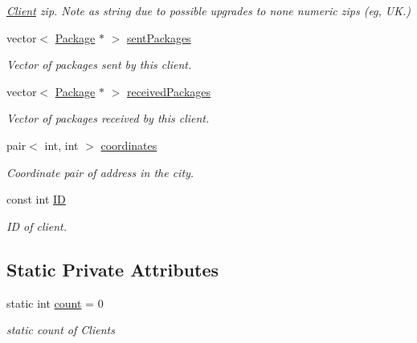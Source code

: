 \begin{DoxyCompactItemize}
\begin{DoxyCompactList}\small\item\em \hyperlink{classClient}{Client} zip. Note as string due to possible upgrades to none numeric zips (eg, UK.) \end{DoxyCompactList}\item 
vector$<$ \hyperlink{classPackage}{Package} $\ast$ $>$ \hyperlink{classClient_a2b2adb035b1729e5914a2ff85e672c88}{sent\+Packages}\hypertarget{classClient_a2b2adb035b1729e5914a2ff85e672c88}{}\label{classClient_a2b2adb035b1729e5914a2ff85e672c88}

\begin{DoxyCompactList}\small\item\em Vector of packages sent by this client. \end{DoxyCompactList}\item 
vector$<$ \hyperlink{classPackage}{Package} $\ast$ $>$ \hyperlink{classClient_ae0b61b806652c0dd46a5ef3e0308fb51}{received\+Packages}\hypertarget{classClient_ae0b61b806652c0dd46a5ef3e0308fb51}{}\label{classClient_ae0b61b806652c0dd46a5ef3e0308fb51}

\begin{DoxyCompactList}\small\item\em Vector of packages received by this client. \end{DoxyCompactList}\item 
pair$<$ int, int $>$ \hyperlink{classClient_a521946a39509ca76f9ef7bea68e47153}{coordinates}\hypertarget{classClient_a521946a39509ca76f9ef7bea68e47153}{}\label{classClient_a521946a39509ca76f9ef7bea68e47153}

\begin{DoxyCompactList}\small\item\em Coordinate pair of address in the city. \end{DoxyCompactList}\item 
const int \hyperlink{classClient_a08c0686b646ab315da55e7f910af7a28}{ID}\hypertarget{classClient_a08c0686b646ab315da55e7f910af7a28}{}\label{classClient_a08c0686b646ab315da55e7f910af7a28}

\begin{DoxyCompactList}\small\item\em ID of client. \end{DoxyCompactList}\end{DoxyCompactItemize}
\subsection*{Static Private Attributes}
\begin{DoxyCompactItemize}
\item 
static int \hyperlink{classClient_a23391f807266e671b35c4a490fca2693}{count} = 0\hypertarget{classClient_a23391f807266e671b35c4a490fca2693}{}\label{classClient_a23391f807266e671b35c4a490fca2693}

\begin{DoxyCompactList}\small\item\em static count of Clients \end{DoxyCompactList}\end{DoxyCompactItemize}

